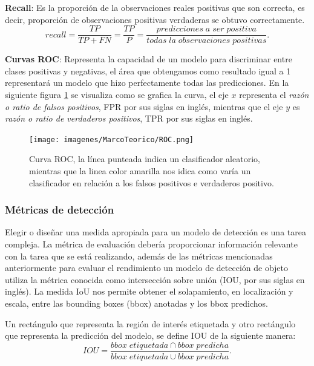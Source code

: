 \textbf{Recall}: Es la proporción de la observaciones reales positivas que son correcta, es decir, proporción de observaciones positivas verdaderas se obtuvo correctamente.
\begin{equation}
recall = \frac{TP}{TP+FN} = \frac{TP}{P} = \frac{predicciones\;a\;ser\;positiva}{todas\;la\;observaciones\;positivas} .
\end{equation}

\textbf{Curvas ROC}: Representa la capacidad de un modelo para discriminar entre clases positivas y negativas, el área que obtengamos  como resultado igual a 1 representará un modelo que hizo perfectamente todas las predicciones. En la siguiente figura \ref{Fig: roc} se visualiza como se grafica la curva, el eje $x$ representa el \textit{razón o ratio de falsos positivos}, FPR por sus siglas en inglés, mientras que el eje $y$ es \textit{razón o ratio de verdaderos positivos}, TPR por sus siglas en inglés.

\begin{figure}[H]
 \centering
  \texttt{[image: imagenes/MarcoTeorico/ROC.png]}
  \caption{Curva ROC, la línea punteada indica un clasificador aleatorio, mientras que la linea color amarilla nos idica como varía un clasificador en relación a los falsos positivos e verdaderos positivo.} \label{Fig: roc}
\end{figure}

\subsubsection*{Métricas de detección}\label{sub:metricas_de_deteccion}
Elegir o diseñar una medida apropiada para un modelo de detección es una tarea compleja. La métrica de evaluación debería proporcionar información relevante con la tarea que se está realizando, además de las métricas mencionadas anteriormente para evaluar el rendimiento un modelo de detección de objeto utiliza la métrica conocida como intersección sobre unión (IOU, por sus siglas en inglés). La medida IoU nos permite obtener el solapamiento, en localización y escala, entre las bounding boxes (bbox) anotadas y los bbox	 predichos.

Un rectángulo que representa la región de interés etiquetada y otro rectángulo que representa la predicción del modelo, se define IOU de la siguiente manera:
\begin{equation}
IOU = \frac{bbox\;etiquetada \cap bbox\;predicha}{bbox\;etiquetada \cup bbox\;predicha}.
\end{equation}

